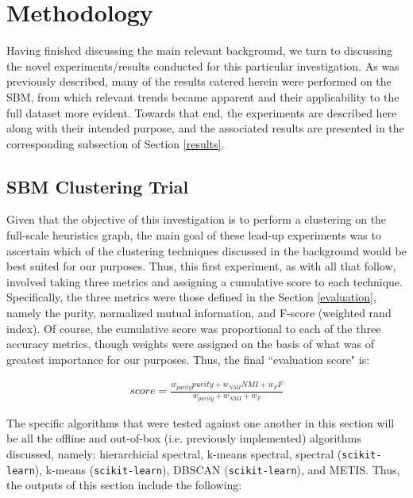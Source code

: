 \documentclass{article}
\begin{document}
\clearpage
\section{Methodology}\label{methodology}
Having finished discussing the main relevant background, we turn to discussing the novel experiments/results conducted for this particular investigation. As was previously described, many of the results catered herein were performed on the SBM, from which relevant trends became apparent and their applicability to the full dataset more evident. Towards that end, the experiments are described here along with their intended purpose, and the associated results are presented in the corresponding subsection of Section \ref{results}.

\subsection{SBM Clustering Trial}
Given that the objective of this investigation is to perform a clustering on the full-scale heuristics graph, the main goal of these lead-up experiments was to ascertain which of the clustering techniques discussed in the background would be best suited for our purposes. Thus, this first experiment, as with all that follow, involved taking three metrics and assigning a cumulative score to each technique. Specifically, the three metrics were those defined in the Section \ref{evaluation}, namely the purity, normalized mutual information, and F-score (weighted rand index). Of course, the cumulative score was proportional to each of the three accuracy metrics, though weights were assigned on the basis of what was of greatest importance for our purposes. Thus, the final ``evaluation score" is:

\begin{align}
    score = \frac{w_{purity}purity + w_{NMI}NMI + w_{F}F}{w_{purity} + w_{NMI} + w_{F}}\label{eq:overall}
\end{align}

The specific algorithms that were tested against one another in this section will be all the offline and out-of-box (i.e. previously implemented) algorithms discussed, namely: hierarchicial spectral, k-means spectral, spectral (\texttt{scikit-learn}), k-means (\texttt{scikit-learn}), DBSCAN (\texttt{scikit-learn}), and METIS. Thus, the outputs of this section include the following:
\end{document}
